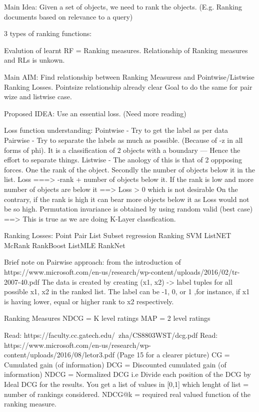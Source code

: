 \documentclass[11pt]{report}
\begin{document}
\iffalse
Main Idea:
    Given a set of objects, we need to rank the objects. (E.g. Ranking documents based on relevance to a query)
    

3 types of ranking functions:


Evalution of learnt RF = Ranking measures.
Relationship of Ranking measures and RLs is unkown.


Main AIM:
    Find relationship between Ranking Measuress and Pointwise/Listwise Ranking Losses.
    Pointsize relationship already clear
    Goal to do the same for pair wize and listwise case.

Proposed IDEA:
    Use an essential loss. (Need more reading)

Loss function understanding:
Pointwise - Try to get the label as per data
Pairwise - Try to separate the labels as much as possible. (Because of -z in all forms of phi).
           It is a classification of 2 objects with a boundary --- Hence the effort to separate things.
Listwise - The anology of this is that of 2 oppposing forces. One the rank of the object. Secondly
           the number of objects below it in the list.
           Loss ===> -rank + number of objects below it.
                If the rank is low and more number of objects are below it ==> Loss > 0 which is not desirable
                On the contrary, if the rank is high it can bear more objects below it as Loss would not be so high.
           Permutation invariance is obtained by using random valid (best case)
        ==> This is true as we are doing K-Layer classfication.


Ranking Losses:
    Point               Pair            List
    Subset regression   Ranking SVM     ListNET
    McRank              RankBoost       ListMLE
                        RankNet

Brief note on Pairwise approach: from the introduction of https://www.microsoft.com/en-us/research/wp-content/uploads/2016/02/tr-2007-40.pdf
    The data is created by creating (x1, x2) -> label tuples for all possible x1, x2 in the ranked list. The label can be -1, 0, or 1
    ,for instance, if x1 is having lower, equal or higher rank to x2 respectively.

Ranking Measures
    NDCG = K level ratings
    MAP = 2 level ratings

    Read: https://faculty.cc.gatech.edu/~zha/CS8803WST/dcg.pdf
    Read: https://www.microsoft.com/en-us/research/wp-content/uploads/2016/08/letor3.pdf (Page 15 for a clearer picture)
        CG = Cumulated gain (of information)
        DCG = Discounted cumulated gain (of information)
        NDCG = Normalized DCG i.e Divide each position of the DCG by Ideal DCG for the results.
               You get a list of values in [0,1] which lenght of list = number of rankings considered.
        NDCG@k = required real valued function of the ranking measure.
\end{document}
